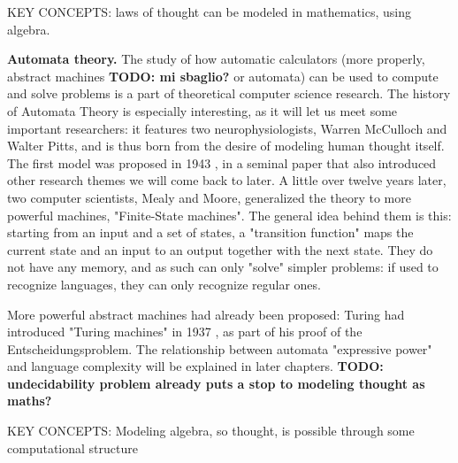 \documentclass[../main.tex]{subfiles}
\begin{document}
KEY CONCEPTS: laws of thought can be modeled in mathematics, using algebra.

\vspace{4pt}
\textbf{Automata theory.} The study of how automatic calculators (more properly, abstract machines \textbf{TODO: mi sbaglio?} or automata) can be used to compute and solve problems is a part of theoretical computer science research. The history of Automata Theory is especially interesting, as it will let us meet some important researchers: it features two neurophysiologists, Warren McCulloch and Walter Pitts, and is thus born from the desire of modeling human thought itself. The first model was proposed in 1943 \cite{mccullochLogicalCalculusIdeas1943}, in a seminal paper that also introduced other research themes we will come back to later. A little over twelve years later, two computer scientists, Mealy and Moore, generalized the theory to more powerful machines, "Finite-State machines". The general idea behind them is this: starting from an input and a set of states, a "transition function" maps the current state and an input to an output together with the next state. They do not have any memory, and as such can only "solve" simpler problems: if used to recognize languages, they can only recognize regular ones.

More powerful abstract machines had already been proposed: Turing had introduced "Turing machines" in 1937 \cite{turingComputableNumbersApplication1937}, as part of his proof of the Entscheidungsproblem. The relationship between automata "expressive power" and language complexity will be explained in later chapters. \textbf{TODO: undecidability problem already puts a stop to modeling thought as maths?}

KEY CONCEPTS: Modeling algebra, so thought, is possible through some computational structure
\end{document}
